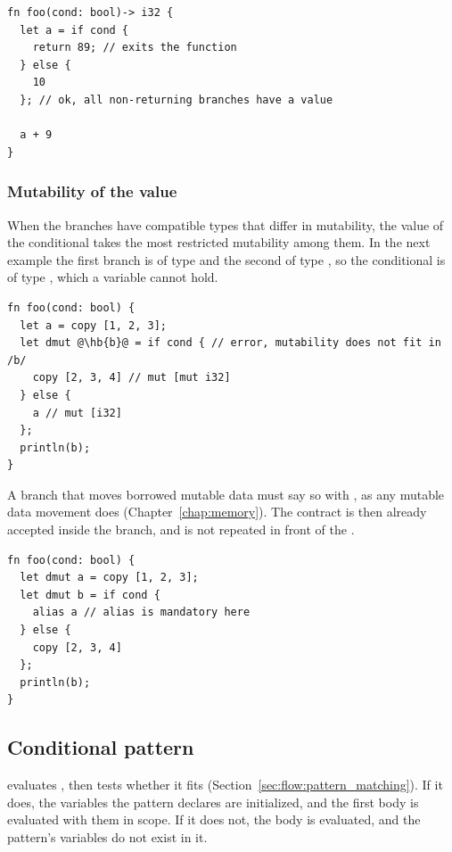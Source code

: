 

\begin{lstlisting}[style=coloredverbatim, caption=Early return in \token{if} condition, label=lst:flow:if_cond_early_return]
fn foo(cond: bool)-> i32 {
  let a = if cond {
    return 89; // exits the function
  } else {
    10
  }; // ok, all non-returning branches have a value

  a + 9
}
\end{lstlisting}

\subsubsection{Mutability of the value}

When the branches have compatible types that differ in mutability, the value of
the conditional takes the most restricted mutability among them. In the next
example the first branch is of type  and the second of type
, so the conditional is of type , which a
 variable cannot hold.

\begin{lstlisting}[style=coloredverbatimError, escapechar=@]
fn foo(cond: bool) {
  let a = copy [1, 2, 3];
  let dmut @\hb{b}@ = if cond { // error, mutability does not fit in /b/
    copy [2, 3, 4] // mut [mut i32]
  } else {
    a // mut [i32]
  };
  println(b);
}
\end{lstlisting}

A branch that moves borrowed mutable data must say so with , as any
mutable data movement does (Chapter~\ref{chap:memory}). The contract is then
already accepted inside the branch, and is not repeated in front of the
.

\begin{lstlisting}[style=coloredverbatim]
fn foo(cond: bool) {
  let dmut a = copy [1, 2, 3];
  let dmut b = if cond {
    alias a // alias is mandatory here
  } else {
    copy [2, 3, 4]
  };
  println(b);
}
\end{lstlisting}

\subsection{Conditional pattern}
\label{sec:flow:cond_pattern}

 evaluates , then tests whether it
fits  (Section~\ref{sec:flow:pattern_matching}). If it does, the
variables the pattern declares are initialized, and the first body is evaluated
with them in scope. If it does not, the  body is evaluated, and the
pattern's variables do not exist in it.

